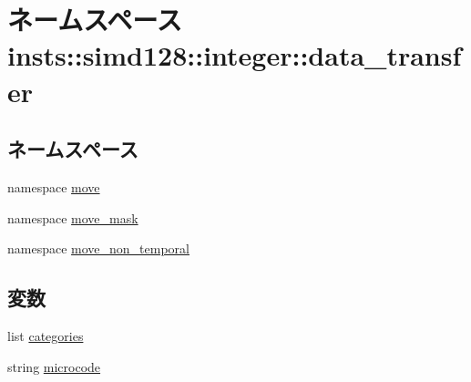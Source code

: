 \hypertarget{namespaceinsts_1_1simd128_1_1integer_1_1data__transfer}{
\section{ネームスペース insts::simd128::integer::data\_\-transfer}
\label{namespaceinsts_1_1simd128_1_1integer_1_1data__transfer}
}
\subsection*{ネームスペース}
\begin{DoxyCompactItemize}
\item 
namespace \hyperlink{namespaceinsts_1_1simd128_1_1integer_1_1data__transfer_1_1move}{move}
\item 
namespace \hyperlink{namespaceinsts_1_1simd128_1_1integer_1_1data__transfer_1_1move__mask}{move\_\-mask}
\item 
namespace \hyperlink{namespaceinsts_1_1simd128_1_1integer_1_1data__transfer_1_1move__non__temporal}{move\_\-non\_\-temporal}
\end{DoxyCompactItemize}
\subsection*{変数}
\begin{DoxyCompactItemize}
\item 
list \hyperlink{namespaceinsts_1_1simd128_1_1integer_1_1data__transfer_a273cf0f1630af14c1582f05e53354a55}{categories}
\item 
string \hyperlink{namespaceinsts_1_1simd128_1_1integer_1_1data__transfer_a770f11a173e99389a8802f0107ed8f52}{microcode}
\end{DoxyCompactItemize}


